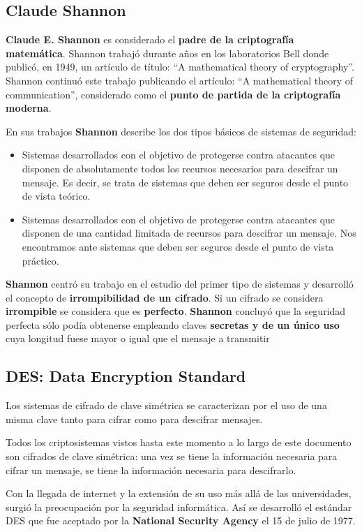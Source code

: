 \documentclass[nochap]{apuntesURJC}
\begin{document}
\subsection{Claude Shannon}
\textbf{Claude E. Shannon} es considerado el \textbf{padre de la criptografía matemática}. Shannon trabajó durante años en los laboratorios Bell donde publicó, en 1949, un artículo de título: ``A mathematical theory of cryptography''. Shannon continuó este trabajo publicando el artículo: ``A mathematical theory of communication'', considerado como el \textbf{punto de partida de la criptografía moderna}.

En sus trabajos \textbf{Shannon} describe los dos tipos básicos de sistemas de seguridad:
\begin{itemize}
\item Sistemas desarrollados con el objetivo de protegerse contra atacantes que disponen de absolutamente todos los recursos necesarios para descifrar un mensaje. Es decir, se trata de sistemas que deben ser seguros desde el punto de vista teórico.
\item Sistemas desarrollados con el objetivo de protegerse contra atacantes que disponen de una cantidad limitada de recursos para descifrar un mensaje. Nos encontramos ante sistemas que deben ser seguros desde el punto de vista práctico.
\end{itemize}

\textbf{Shannon} centró su trabajo en el estudio del primer tipo de sistemas y desarrolló el concepto de \textbf{irrompibilidad de un cifrado}. Si un cifrado se considera \textbf{irrompible} se considera que es \textbf{perfecto}. \textbf{Shannon} concluyó que la seguridad perfecta sólo podía obtenerse empleando claves \textbf{secretas y de un único uso} cuya longitud fuese mayor o igual que el mensaje a transmitir

\subsection{DES: Data Encryption Standard}
Los sistemas de cifrado de clave simétrica se caracterizan por el uso de una misma clave tanto para cifrar como para descifrar mensajes.

Todos los criptosistemas vistos hasta este momento a lo largo de este documento son cifrados de clave simétrica: una vez se tiene la información necesaria para cifrar un mensaje, se tiene la información necesaria para descifrarlo.

Con la llegada de internet y la extensión de su uso más allá de las universidades, surgió la preocupación por la seguridad informática. Así se desarrolló el estándar DES que fue aceptado por la \textbf{National Security Agency} el 15 de julio de 1977.
\end{document}
